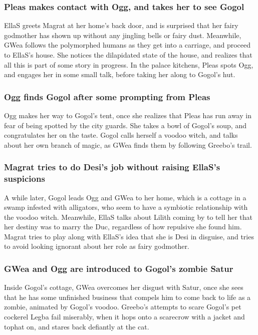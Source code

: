 \subsubsection{\Gls{Pleas} makes contact with \Gls{Ogg}, and takes her to see \Gls{Gogol}}
\Gls{EllaS} greets \Gls{Magrat} at her home's back door, and is surprised that her fairy godmother
has shown up without any jingling bells or fairy dust. Meanwhile, \Gls{GWea} follows the polymorphed
humans as they get into a carriage, and proceed to \Gls{EllaS}'s house. She notices the dilapidated
state of the house, and realizes that all this is part of some story in progress. In the palace
kitchens, \Gls{Pleas} spots \Gls{Ogg}, and engages her in some small talk, before taking her along
to \Gls{Gogol}'s hut.

\subsubsection{\Gls{Ogg} finds \Gls{Gogol} after some prompting from \Gls{Pleas}}
\Gls{Ogg} makes her way to \Gls{Gogol}'s tent, once she realizes that \Gls{Pleas} has run away in
fear of being spotted by the city guards. She takes a bowl of \Gls{Gogol}'s soup, and congratulates
her on the taste. \Gls{Gogol} calls herself a voodoo witch, and talks about her own branch of magic,
as \Gls{GWea} finds them by following \Gls{Greebo}'s trail.

\subsubsection{\Gls{Magrat} tries to do \Gls{Desi}'s job without raising \Gls{EllaS}'s suspicions}
A while later, \Gls{Gogol} leads \Gls{Ogg} and \Gls{GWea} to her home, which is a cottage in a
swamp infested with alligators, who seem to have a symbiotic relationship with the voodoo witch.
Meanwhile, \Gls{EllaS} talks about \Gls{Lilith} coming by to tell her that her destiny was to marry
the \Gls{Duc}, regardless of how repulsive she found him. \Gls{Magrat} tries to play along with
\Gls{EllaS}'s idea that she is \Gls{Desi} in disguise, and tries to avoid looking ignorant about her
role as fairy godmother.

\subsubsection{\Gls{GWea} and \Gls{Ogg} are introduced to \Gls{Gogol}'s zombie \Gls{Satur}}
Inside \Gls{Gogol}'s cottage, \Gls{GWea} overcomes her disgust with \Gls{Satur}, once she sees that
he has some unfinished business that compels him to come back to life as a zombie, animated by
\Gls{Gogol}'s voodoo. \Gls{Greebo}'s attempts to scare \Gls{Gogol}'s pet cockerel \Gls{Legba} fail
miserably, when it hops onto a scarecrow with a jacket and tophat on, and stares back defiantly at
the cat.

